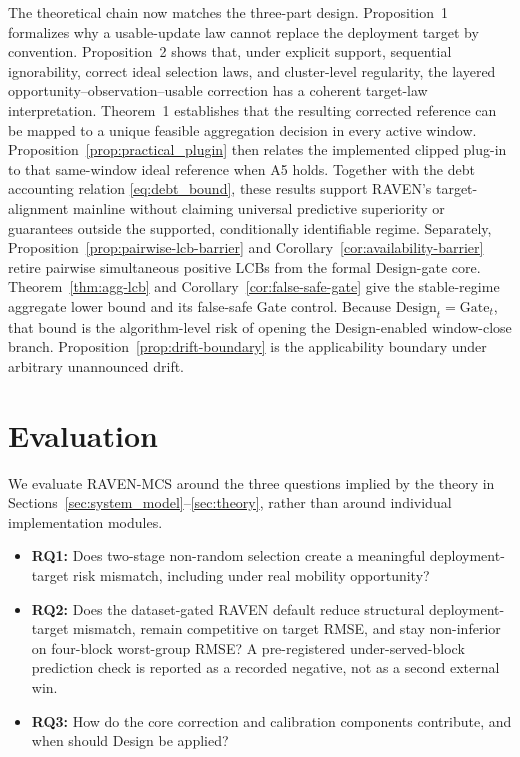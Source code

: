 \documentclass[letterpaper,journal]{IEEEtran}
\begin{document}
The theoretical chain now matches the three-part design.  Proposition~1
formalizes why a usable-update law cannot replace the deployment target by
convention.  Proposition~2 shows that, under explicit support, sequential
ignorability, correct ideal selection laws, and cluster-level regularity, the
layered opportunity--observation--usable correction has a coherent target-law
interpretation.  Theorem~1 establishes that the resulting corrected reference
can be mapped to a unique feasible aggregation decision in every active window.
Proposition~\ref{prop:practical_plugin} then relates the implemented
clipped plug-in to that same-window ideal reference when A5 holds.
Together with the debt accounting relation
\eqref{eq:debt_bound}, these results support RAVEN's target-alignment mainline
without claiming universal predictive superiority or guarantees outside the
supported, conditionally identifiable regime.  Separately,
Proposition~\ref{prop:pairwise-lcb-barrier} and
Corollary~\ref{cor:availability-barrier} retire pairwise simultaneous positive
LCBs from the formal Design-gate core.
Theorem~\ref{thm:agg-lcb} and Corollary~\ref{cor:false-safe-gate} give the
stable-regime aggregate lower bound and its false-safe Gate control.
Because $\mathrm{Design}_t=\mathrm{Gate}_t$, that bound is the algorithm-level
risk of opening the Design-enabled window-close branch.
Proposition~\ref{prop:drift-boundary} is the applicability boundary under
arbitrary unannounced drift.




\section{Evaluation}
\label{sec:evaluation}

We evaluate RAVEN-MCS around the three questions implied by the theory in
Sections~\ref{sec:system_model}--\ref{sec:theory}, rather than around individual
implementation modules.

\begin{itemize}
    \item \textbf{RQ1:} Does two-stage non-random selection create a meaningful
    deployment-target risk mismatch, including under real mobility
    opportunity?
    \item \textbf{RQ2:} Does the dataset-gated RAVEN default reduce
    structural deployment-target mismatch, remain competitive on
    target RMSE, and stay non-inferior on four-block worst-group RMSE?
    A pre-registered under-served-block prediction check is reported
    as a recorded negative, not as a second external win.
    \item \textbf{RQ3:} How do the core correction and calibration components
    contribute, and when should Design be applied?
\end{itemize}
\end{document}
